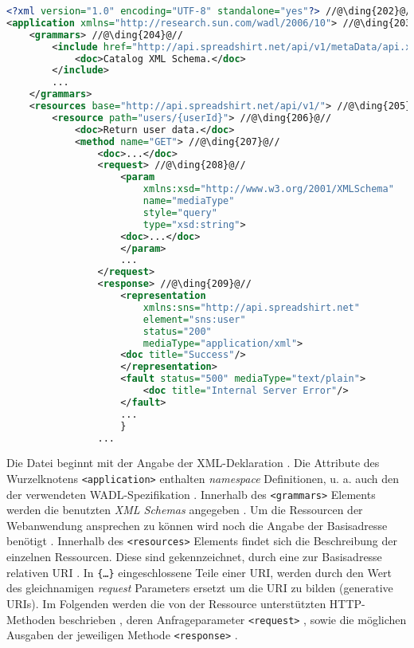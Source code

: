 \begin{lstlisting}[language=XML, caption={Beispielaufbau einer WADL-Datei anhand der Spreadshirt-API Beschreibung}, label=lst:wadlstructure, name=wadlstructure]
<?xml version="1.0" encoding="UTF-8" standalone="yes"?> //@\ding{202}@//
<application xmlns="http://research.sun.com/wadl/2006/10"> //@\ding{203}@//
    <grammars> //@\ding{204}@//
        <include href="http://api.spreadshirt.net/api/v1/metaData/api.xsd">
            <doc>Catalog XML Schema.</doc>
        </include>
        ...
    </grammars>
    <resources base="http://api.spreadshirt.net/api/v1/"> //@\ding{205}@//
        <resource path="users/{userId}"> //@\ding{206}@//
            <doc>Return user data.</doc>
            <method name="GET"> //@\ding{207}@//
                <doc>...</doc>
                <request> //@\ding{208}@//
                    <param 
                        xmlns:xsd="http://www.w3.org/2001/XMLSchema" 
                        name="mediaType" 
                        style="query" 
                        type="xsd:string">
                    <doc>...</doc>
                    </param>
                    ...
                </request>
                <response> //@\ding{209}@//
                    <representation 
                        xmlns:sns="http://api.spreadshirt.net"
                        element="sns:user" 
                        status="200" 
                        mediaType="application/xml">
                    <doc title="Success"/>
                    </representation>
                    <fault status="500" mediaType="text/plain">
                        <doc title="Internal Server Error"/>
                    </fault>
                    ...
                    }
                ...
\end{lstlisting}

Die Datei beginnt mit der Angabe der XML-Deklaration .
Die Attribute des Wurzelknotens \texttt{<application>} enthalten \emph{namespace} Definitionen, u. a. auch den der verwendeten WADL-Spezifikation .
Innerhalb des \texttt{<grammars>} Elements werden die benutzten \emph{XML Schemas} angegeben . 
Um die Ressourcen der Webanwendung ansprechen zu können wird noch die Angabe der Basisadresse benötigt . 
Innerhalb des \texttt{<resources>} Elements findet sich die Beschreibung der einzelnen Ressourcen. Diese sind gekennzeichnet, durch eine zur Basisadresse relativen \gls{URI} . In \texttt{\{\ldots\}} eingeschlossene Teile einer \gls{URI}, werden durch den Wert des gleichnamigen \emph{request} Parameters ersetzt um die URI zu bilden (generative URIs).
Im Folgenden werden die von der Ressource unterstützten HTTP-Methoden beschrieben , deren Anfrageparameter \texttt{<request>} , sowie die möglichen Ausgaben der jeweiligen Methode \texttt{<response>} .

